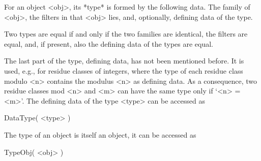 For an object <obj>, its *type* is formed by the following data.
The family of <obj>,
the filters in that <obj> lies,
and, optionally, defining data of the type.

Two types are equal if and only if the two families are identical,
the filters are equal, and, if present, also the defining data of the
types are equal.

The last part of the type, defining data, has not been mentioned before.
It is used, e.g., for residue classes of integers, where the type of each
residue class modulo <n> contains the modulus <n> as defining data.
As a consequence, two residue classes mod <n> and <m> can have the same
type only if `<n> = <m>'.
The defining data of the type <type> can be accessed as
%
%
%
%

\>DataType( <type> )

The type of an object is itself an object,
it can be accessed as

\>TypeObj( <obj> )

